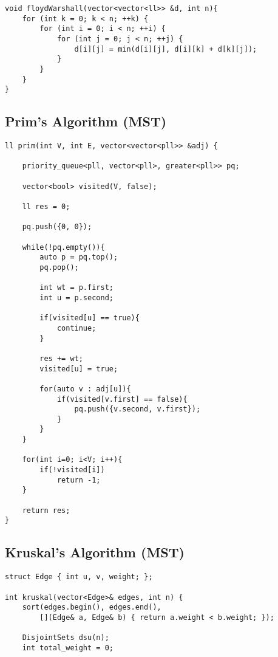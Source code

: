 \documentclass[10pt]{article}
\begin{document}
\begin{multicols*}{2}
\begin{lstlisting}[style=compactcpp]
void floydWarshall(vector<vector<ll>> &d, int n){
    for (int k = 0; k < n; ++k) {
        for (int i = 0; i < n; ++i) {
            for (int j = 0; j < n; ++j) {
                d[i][j] = min(d[i][j], d[i][k] + d[k][j]); 
            }
        }
    }
}
\end{lstlisting}

\subsection{Prim's Algorithm (MST)}

\begin{lstlisting}[style=compactcpp]
ll prim(int V, int E, vector<vector<pll>> &adj) {
  
    priority_queue<pll, vector<pll>, greater<pll>> pq; 
    
    vector<bool> visited(V, false);
    
    ll res = 0;
    
    pq.push({0, 0});
    
    while(!pq.empty()){
        auto p = pq.top();
        pq.pop();
        
        int wt = p.first; 
        int u = p.second;
        
        if(visited[u] == true){
            continue; 
        }
        
        res += wt;
        visited[u] = true;
        
        for(auto v : adj[u]){
            if(visited[v.first] == false){
                pq.push({v.second, v.first});
            }
        }
    }

    for(int i=0; i<V; i++){
        if(!visited[i])
            return -1;
    }
    
    return res;
}
\end{lstlisting}

\subsection{Kruskal's Algorithm (MST)}

\begin{lstlisting}[style=compactcpp]
struct Edge { int u, v, weight; };

int kruskal(vector<Edge>& edges, int n) {
    sort(edges.begin(), edges.end(), 
        [](Edge& a, Edge& b) { return a.weight < b.weight; });
    
    DisjointSets dsu(n);
    int total_weight = 0;
    

\end{lstlisting}
\end{multicols*}
\end{document}
